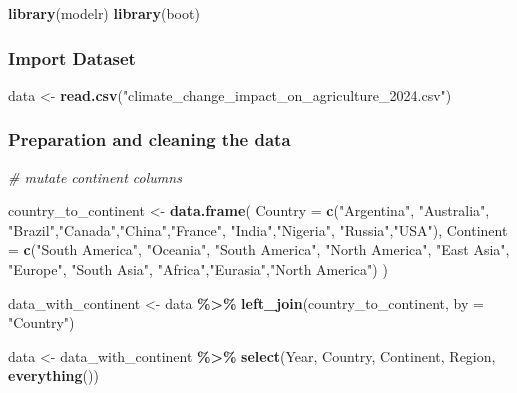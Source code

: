 \documentclass[
]{article}
\newenvironment{Shaded}{\begin{snugshade}}{\end{snugshade}}
\newcommand{\AttributeTok}[1]{\textcolor[rgb]{0.13,0.29,0.53}{#1}}
\newcommand{\CommentTok}[1]{\textcolor[rgb]{0.56,0.35,0.01}{\textit{#1}}}
\newcommand{\FunctionTok}[1]{\textcolor[rgb]{0.13,0.29,0.53}{\textbf{#1}}}
\newcommand{\NormalTok}[1]{#1}
\newcommand{\OtherTok}[1]{\textcolor[rgb]{0.56,0.35,0.01}{#1}}
\newcommand{\SpecialCharTok}[1]{\textcolor[rgb]{0.81,0.36,0.00}{\textbf{#1}}}
\newcommand{\StringTok}[1]{\textcolor[rgb]{0.31,0.60,0.02}{#1}}
\begin{document}
\begin{Shaded}
\begin{Highlighting}[]
\FunctionTok{library}\NormalTok{(modelr)}
\FunctionTok{library}\NormalTok{(boot)}
\end{Highlighting}
\end{Shaded}

\hypertarget{import-dataset}{%
\subsubsection{Import Dataset}\label{import-dataset}}

\begin{Shaded}
\begin{Highlighting}[]
\NormalTok{data }\OtherTok{\textless{}{-}} \FunctionTok{read.csv}\NormalTok{(}\StringTok{"climate\_change\_impact\_on\_agriculture\_2024.csv"}\NormalTok{)}
\end{Highlighting}
\end{Shaded}

\hypertarget{preparation-and-cleaning-the-data}{%
\subsubsection{Preparation and cleaning the
data}\label{preparation-and-cleaning-the-data}}

\begin{Shaded}
\begin{Highlighting}[]
\CommentTok{\# mutate continent columns}

\NormalTok{country\_to\_continent }\OtherTok{\textless{}{-}} \FunctionTok{data.frame}\NormalTok{(}
  \AttributeTok{Country =} \FunctionTok{c}\NormalTok{(}\StringTok{"Argentina"}\NormalTok{, }\StringTok{"Australia"}\NormalTok{, }\StringTok{"Brazil"}\NormalTok{,}\StringTok{"Canada"}\NormalTok{,}\StringTok{"China"}\NormalTok{,}\StringTok{"France"}\NormalTok{,}
              \StringTok{"India"}\NormalTok{,}\StringTok{"Nigeria"}\NormalTok{, }\StringTok{"Russia"}\NormalTok{,}\StringTok{"USA"}\NormalTok{),}
  \AttributeTok{Continent =} \FunctionTok{c}\NormalTok{(}\StringTok{"South America"}\NormalTok{, }\StringTok{"Oceania"}\NormalTok{, }\StringTok{"South America"}\NormalTok{, }
                \StringTok{"North America"}\NormalTok{, }\StringTok{"East Asia"}\NormalTok{, }\StringTok{"Europe"}\NormalTok{, }
                \StringTok{"South Asia"}\NormalTok{, }\StringTok{"Africa"}\NormalTok{,}\StringTok{"Eurasia"}\NormalTok{,}\StringTok{"North America"}\NormalTok{)}
\NormalTok{)}

\NormalTok{data\_with\_continent }\OtherTok{\textless{}{-}}\NormalTok{ data }\SpecialCharTok{\%\textgreater{}\%}
  \FunctionTok{left\_join}\NormalTok{(country\_to\_continent, }\AttributeTok{by =} \StringTok{"Country"}\NormalTok{) }

\NormalTok{data }\OtherTok{\textless{}{-}}\NormalTok{ data\_with\_continent }\SpecialCharTok{\%\textgreater{}\%}
  \FunctionTok{select}\NormalTok{(Year, Country, Continent, Region, }\FunctionTok{everything}\NormalTok{())}
\end{Highlighting}
\end{Shaded}
\end{document}
